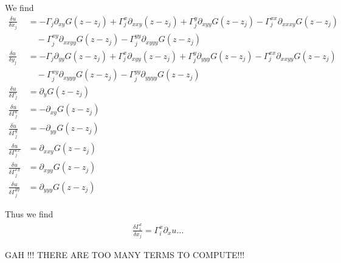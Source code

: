 \documentclass[12pt]{amsart}
\begin{document}
We find
\begin{align*}
  \frac{\delta u}{\delta x_j} &= - \Gamma_j \partial_{xy} G(z-z_j) + \Gamma_j^x \partial_{xxy}(z-z_j)
  + \Gamma_j^y \partial_{xyy}G(z-z_j) - \Gamma_j^{xx} \partial_{xxxy}G(z-z_j) \\
  &\quad- \Gamma_j^{xy} \partial_{xxyy}G(z-z_j) - \Gamma_j^{yy} \partial_{xyyy} G(z-z_j) \\
  \frac{\delta u}{\delta y_j} &= - \Gamma_j \partial_{yy} G(z-z_j) + \Gamma_j^x \partial_{xyy}(z-z_j)
  + \Gamma_j^y \partial_{yyy}G(z-z_j) - \Gamma_j^{xx} \partial_{xxyy}G(z-z_j) \\
  &\quad- \Gamma_j^{xy} \partial_{xyyy}G(z-z_j) - \Gamma_j^{yy} \partial_{yyyy} G(z-z_j) \\
  \frac{\delta u}{\delta \Gamma_j} &= \partial_y G(z-z_j) \\
  \frac{\delta u}{\delta \Gamma^x_j} &= -\partial_{xy} G(z-z_j) \\
  \frac{\delta u}{\delta \Gamma^y_j} &= -\partial_{yy} G(z-z_j) \\
  \frac{\delta u}{\delta \Gamma^{xx}_j} &= \partial_{xxy} G(z-z_j) \\
  \frac{\delta u}{\delta \Gamma^{xy}_j} &= \partial_{xyy} G(z-z_j) \\
  \frac{\delta u}{\delta \Gamma^{yy}_j} &= \partial_{yyy} G(z-z_j)
\end{align*}

Thus we find
\begin{align*}
  \frac{\delta \dot{\Gamma_i^x}}{\delta x_j} = \Gamma_i^x \partial_x u \dots
\end{align*}


GAH !!! THERE ARE TOO MANY TERMS TO COMPUTE!!!
\end{document}
